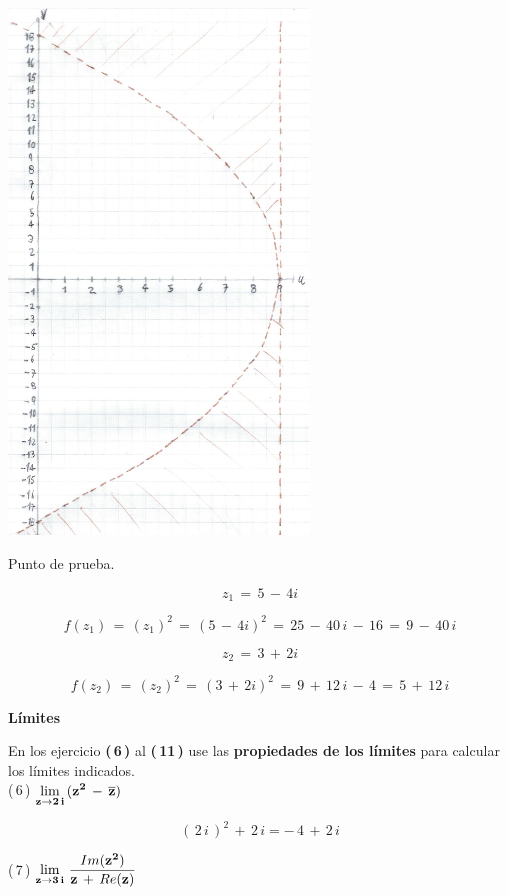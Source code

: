 \documentclass[a4paper,11pt,openany]{book}
\begin{document}
\begin{center}
     \includegraphics[width=8cm]{Mapeo-Ej-5-w.png}
\end{center}

\textcolor{ao(english)}{} Punto de prueba.

$$z_{1}\,=\,5\,-\,4i$$

$$f(z_{1})\,=\,(z_{1})^{2}\,=\,(5\,-\,4i)^{2}\,=\,25\,-\,40\,i\,-\,16\,=\,9\,-\,40\,i$$


$$z_{2}\,=\,3\,+\,2i$$

$$f(z_{2})\,=\,(z_{2})^{2}\,=\,(3\,+\,2i)^{2}\,=\,9\,+\,12\,i\,-\,4\,=\,5\,+\,12\,i$$

\begin{center}
\textbf{Límites}
\end{center}

En los ejercicio \textbf{(\,6\,)} al \textbf{(\,11\,)} use las \textbf{propiedades de los límites} para calcular los límites indicados.\\

\textcolor{ao(english)}{(\,6\,)} $\bf{\displaystyle\lim_{z \to 2\,i}\,(z^{2}\,-\,\overline{z})}$

$$ (\,2\,i\,)^{2}\,+\,2\,i = \boxed{-\,4\,+\,2\,i}$$

\textcolor{ao(english)}{(\,7\,)} $\bf{\displaystyle\lim_{z \to 3\,i}\,\dfrac{\mathnormal{Im}(z^{2})}{z\,+\,\mathnormal{Re}(z)}}$
\end{document}
